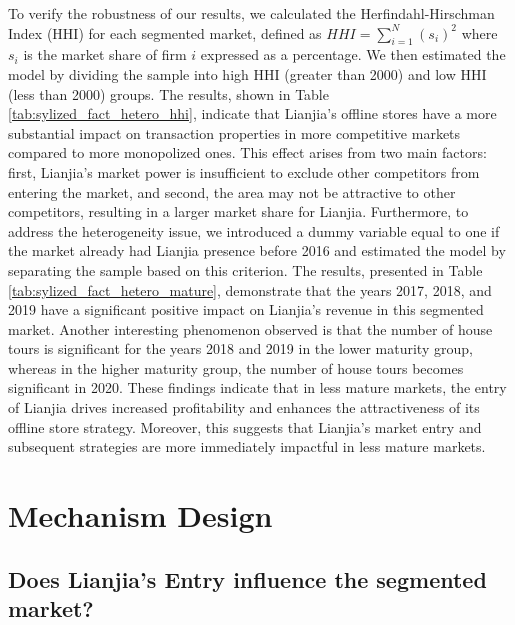 \documentclass[11pt]{article}
\begin{document}
To verify the robustness of our results, we calculated the Herfindahl-Hirschman Index (HHI) for each segmented market, defined as $HHI = \sum_{i=1}^N (s_i)^2$ where $s_i$ is the market share of firm $i$ expressed as a percentage. We then estimated the model by dividing the sample into high HHI (greater than 2000) and low HHI (less than 2000) groups. The results, shown in Table \ref{tab:sylized_fact_hetero_hhi}, indicate that Lianjia's offline stores have a more substantial impact on transaction properties in more competitive markets compared to more monopolized ones. This effect arises from two main factors: first, Lianjia's market power is insufficient to exclude other competitors from entering the market, and second, the area may not be attractive to other competitors, resulting in a larger market share for Lianjia. Furthermore, to address the heterogeneity issue, we introduced a dummy variable equal to one if the market already had Lianjia presence before 2016 and estimated the model by separating the sample based on this criterion. The results, presented in Table \ref{tab:sylized_fact_hetero_mature}, demonstrate that the years 2017, 2018, and 2019 have a significant positive impact on Lianjia's revenue in this segmented market. Another interesting phenomenon observed is that the number of house tours is significant for the years 2018 and 2019 in the lower maturity group, whereas in the higher maturity group, the number of house tours becomes significant in 2020. These findings indicate that in less mature markets, the entry of Lianjia drives increased profitability and enhances the attractiveness of its offline store strategy. Moreover, this suggests that Lianjia's market entry and subsequent strategies are more immediately impactful in less mature markets.



\section{Mechanism Design} \label{sec:mechanism_design}

\subsection{Does Lianjia's Entry influence the segmented market?} \label{subsec:entry_effect}
\end{document}
